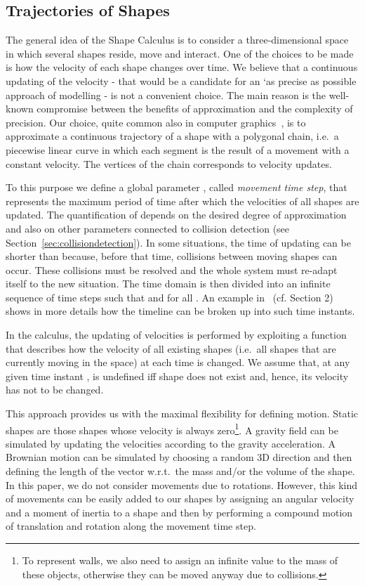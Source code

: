\documentclass[11pt]{article}
\begin{document}
\subsection{Trajectories of Shapes}
\label{sec:trajectories}
The general idea of the Shape Calculus is to consider a three-dimensional space in which several shapes reside, move and interact. One of the choices to be made is how the velocity of each shape changes over time. We believe that a continuous updating of the velocity - that would be a candidate for an `as precise as possible approach of modelling - is not a convenient choice. The main reason is the well-known compromise between the benefits of approximation and the complexity of precision. Our choice, quite common also in computer graphics~\cite{Ericson2005}, is to approximate a continuous trajectory of a shape with a polygonal chain, i.e.\ a piecewise linear curve in which each segment is the result of a movement with a constant velocity. The vertices of the chain corresponds to velocity updates.

To this purpose we define a global parameter , called \emph{movement time step},
that represents the maximum period of time after which the velocities of all shapes are updated.
The quantification of  depends on the desired degree of approximation and also on other
parameters connected to collision detection (see Section~\ref{sec:collisiondetection}). In some situations, the time of updating can be shorter than  because, before that time, collisions between moving shapes can occur. These collisions must be resolved and the whole system must re-adapt itself to the new situation. The time domain  is then divided into an infinite sequence of time steps  such that  and  for all . An example in~\cite{Bartocci2010} (cf. Section 2) shows in more details how the timeline can be broken up into such time instants.

In the calculus, the updating of velocities is performed by exploiting a function  that describes how the velocity of all existing shapes (i.e.\ all shapes that are currently moving in the space) at each time  is changed. We assume that, at any given time instant ,  is undefined iff shape  does not exist and, hence, its velocity has not to be changed.

This approach provides us with the maximal flexibility for defining motion. Static shapes are those shapes whose velocity is always zero\footnote{To represent walls, we also need to assign an infinite value to the mass of these objects, otherwise they can be moved anyway due to collisions.}. A gravity field can be simulated by updating the velocities according to the gravity acceleration. A Brownian motion can be simulated by choosing a random 3D direction and then defining the length of the vector w.r.t.\ the mass and/or the volume of the shape. In this paper, we do not consider movements due to rotations. However, this kind of movements can be easily added to our shapes by assigning an angular velocity and a moment of inertia to a shape and then by performing a compound motion of translation and rotation along the movement time step.
\end{document}
